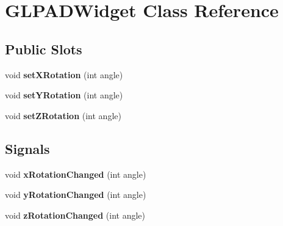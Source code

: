 \hypertarget{class_g_l_p_a_d_widget}{
\section{\-G\-L\-P\-A\-D\-Widget \-Class \-Reference}
\label{class_g_l_p_a_d_widget}
}
\subsection*{\-Public \-Slots}
\begin{DoxyCompactItemize}
\item 
\hypertarget{class_g_l_p_a_d_widget_aa8978c7ce2448478779af8c368cb66c8}{
void {\bfseries set\-X\-Rotation} (int angle)}
\label{class_g_l_p_a_d_widget_aa8978c7ce2448478779af8c368cb66c8}

\item 
\hypertarget{class_g_l_p_a_d_widget_a9b767fbc133c5df074e3395136b331fc}{
void {\bfseries set\-Y\-Rotation} (int angle)}
\label{class_g_l_p_a_d_widget_a9b767fbc133c5df074e3395136b331fc}

\item 
\hypertarget{class_g_l_p_a_d_widget_acceb4de1b21234fed0dd8c39ab46b72f}{
void {\bfseries set\-Z\-Rotation} (int angle)}
\label{class_g_l_p_a_d_widget_acceb4de1b21234fed0dd8c39ab46b72f}

\end{DoxyCompactItemize}
\subsection*{\-Signals}
\begin{DoxyCompactItemize}
\item 
\hypertarget{class_g_l_p_a_d_widget_a4a815783da86aaa7ef6253c036164ec0}{
void {\bfseries x\-Rotation\-Changed} (int angle)}
\label{class_g_l_p_a_d_widget_a4a815783da86aaa7ef6253c036164ec0}

\item 
\hypertarget{class_g_l_p_a_d_widget_a4904dcc5368c92654090363bd857ef8e}{
void {\bfseries y\-Rotation\-Changed} (int angle)}
\label{class_g_l_p_a_d_widget_a4904dcc5368c92654090363bd857ef8e}

\item 
\hypertarget{class_g_l_p_a_d_widget_ac38d547e758cdce12e14bcd8ddc17d33}{
void {\bfseries z\-Rotation\-Changed} (int angle)}
\label{class_g_l_p_a_d_widget_ac38d547e758cdce12e14bcd8ddc17d33}

\end{DoxyCompactItemize}
